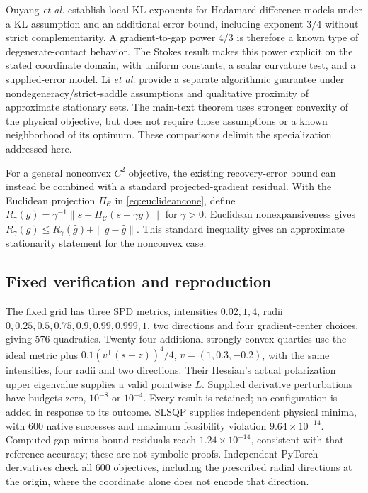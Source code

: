 Ouyang \emph{et al.} \cite[Thm.~3.11, Rem.~3.12]{ouyang} establish local KL exponents for Hadamard difference models under a KL assumption and an additional error bound, including exponent $3/4$ without strict complementarity. A gradient-to-gap power $4/3$ is therefore a known type of degenerate-contact behavior. The Stokes result makes this power explicit on the stated coordinate domain, with uniform constants, a scalar curvature test, and a supplied-error model. Li \emph{et al.} \cite[Thm.~5, Lem.~6.1]{hadamard} provide a separate algorithmic guarantee under nondegeneracy/strict-saddle assumptions and qualitative proximity of approximate stationary sets. The main-text theorem uses stronger convexity of the physical objective, but does not require those assumptions or a known neighborhood of its optimum. These comparisons delimit the specialization addressed here.

For a general nonconvex $C^2$ objective, the existing recovery-error bound can instead be combined with a standard projected-gradient residual. With the Euclidean projection $\Pi_{\mathcal C}$ in \eqref{eq:euclideancone}, define $R_\gamma(g)=\gamma^{-1}\|s-\Pi_{\mathcal C}(s-\gamma g)\|$ for $\gamma>0$. Euclidean nonexpansiveness gives $R_\gamma(g)\le R_\gamma(\widehat g)+\|g-\widehat g\|$. This standard inequality gives an approximate stationarity statement for the nonconvex case.

\subsection{Fixed verification and reproduction}
The fixed grid has three SPD metrics, intensities $0.02,1,4$, radii $0,0.25,0.5,0.75,0.9,0.99,0.999,1$, two directions and four gradient-center choices, giving 576 quadratics. Twenty-four additional strongly convex quartics use the ideal metric plus $0.1(v^{\mathsf T}(s-z))^4/4$, $v=(1,0.3,-0.2)$, with the same intensities, four radii and two directions. Their Hessian's actual polarization upper eigenvalue supplies a valid pointwise $L$. Supplied derivative perturbations have budgets zero, $10^{-8}$ or $10^{-4}$. Every result is retained; no configuration is added in response to its outcome. SLSQP supplies independent physical minima, with 600 native successes and maximum feasibility violation $9.64\times10^{-14}$. Computed gap-minus-bound residuals reach $1.24\times10^{-14}$, consistent with that reference accuracy; these are not symbolic proofs. Independent PyTorch derivatives check all 600 objectives, including the prescribed radial directions at the origin, where the coordinate alone does not encode that direction.

